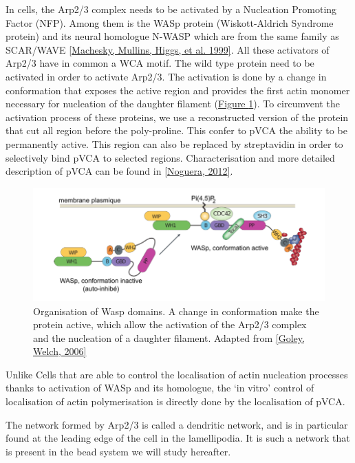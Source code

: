 \documentclass[A4paperpaper,11pt,english]{sphinxmanual}
\begin{document}
In cells, the Arp2/3 complex needs to be activated by a Nucleation Promoting
Factor (NFP).  Among them is the  WASp protein (Wiskott-Aldrich Syndrome
protein) and its neural homologue N-WASP which are from the same family as
SCAR/WAVE {\hyperref[index-latex:machesky1999]{{[}Machesky, Mullins, Higgs,  et al.  1999{]}}}.  All these activators of Arp2/3 have in common a
WCA motif. The wild type protein need to be activated in order to activate Arp2/3.
The activation is done by a change in conformation that exposes the active
region and provides the first actin monomer necessary for nucleation of the
daughter filament (\hyperref[index-latex:fig-pwa-deploy]{Figure  \ref*{index-latex:fig-pwa-deploy}}).  To circumvent the activation process of
these proteins, we use a reconstructed version of the protein that cut all
region before the poly-proline. This confer to pVCA the ability to be
permanently active. This region can also be replaced by streptavidin in order
to selectively bind pVCA to selected regions. Characterisation and more
detailed description of pVCA can be found in {\hyperref[index-latex:noguera2012]{{[}Noguera,  2012{]}}}.
\begin{figure}[htbp]
\centering
\capstart

\includegraphics[width=0.600\linewidth]{pwa-deploy.png}
\caption{Organisation of Wasp domains. A change in conformation make the protein
active, which allow the activation of the Arp2/3 complex and the nucleation
of a daughter filament.  Adapted from {\hyperref[index-latex:goley2006]{{[}Goley, Welch,  2006{]}}}}\label{index-latex:fig-pwa-deploy}\end{figure}

Unlike Cells that are able to control the localisation of actin nucleation
processes thanks to activation of WASp and its homologue, the `in vitro' control
of localisation of actin polymerisation is directly done by the localisation of
pVCA.

The network formed by Arp2/3 is called a dendritic network, and is in
particular found at the leading edge of the cell in the lamellipodia. It is
such a network that is present in the bead system we will study hereafter.
\end{document}
